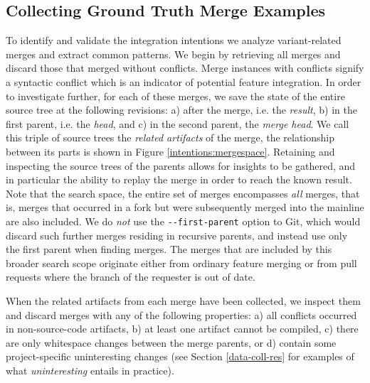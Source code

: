 \subsection{Collecting Ground Truth Merge Examples}
To identify and validate the integration intentions we analyze variant-related merges and extract common patterns. We begin by retrieving all merges and discard those that merged without conflicts. Merge instances with conflicts signify a syntactic conflict which is an indicator of potential feature integration. In order to investigate further, for each of these merges, we save the state of the entire source tree at the following revisions:  
a) after the merge, i.e. the \textit{result},
b) in the first parent, i.e. the \textit{head}, and
c) in the second parent, the \textit{merge head}. We call this triple of source trees the \textit{related artifacts} of the merge, the relationship between its parts is shown in Figure \ref{intentions:mergespace}. Retaining and inspecting the source trees of the parents allows for insights to be gathered, and in particular the ability to replay the merge in order to reach the known result. Note that the search space, the entire set of merges encompasses \textit{all} merges, that is, merges that occurred in a fork but were subsequently merged into the mainline are also included. We do \textit{not} use the \texttt{-{}-first-parent} option to Git, which would discard such further merges residing in recursive parents, and instead use only the first parent when finding merges. The merges that are included by this broader search scope originate either from ordinary feature merging or from pull requests where the branch of the requester is out of date.%

When the related artifacts from each merge have been collected, we inspect them and discard merges with any of the following properties: 
a) all conflicts occurred in non-source-code artifacts, b) at least one artifact cannot be compiled, c) there are only whitespace changes between the merge parents, or d) contain some project-specific uninteresting changes (see Section \ref{data-coll-res} for examples of what \textit{uninteresting} entails in practice).

